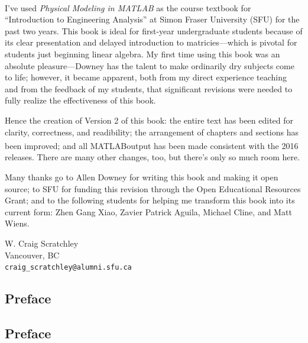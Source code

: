 \documentclass[
]{book}
\newcommand{\myreg}{\textsuperscript{{\tiny \textregistered}}}
\newcommand{\thetitle}{Physical Modeling in MATLAB\myreg}
\begin{document}
I've used \textit{\thetitle} as the course
textbook for ``Introduction to Engineering Analysis'' at Simon Fraser
University (SFU) for the past two years. This book is ideal for
first-year undergraduate students because of its clear presentation and
delayed introduction to matricies---which is pivotal for students
just beginning linear algebra.  My first time using this book was an
absolute pleasure---Downey has the talent to make ordinarily dry
subjects come to life; however, it became apparent, both from my direct
experience teaching and from the feedback of my students, that
significant revisions were needed to fully realize the effectiveness
of this book.

Hence the creation of Version 2 of this book: the entire text
has been edited for clarity, correctness, and readibility; the
arrangement of chapters and sections has been improved;
and all MATLAB\myreg output has been made consistent
with the 2016 releases. There are many other
changes, too, but there's only so much room here.

Many thanks go to Allen Downey for writing this book and making it open
source; to SFU for funding this revision through the Open Educational
Resources Grant; and to the following students for helping me transform
this book into its current form: Zhen Gang Xiao, Zavier Patrick Aguila,
Michael Cline, and Matt Wiens.

\noindent W. Craig Scratchley
\\
\noindent Vancouver, BC
\\
{\tt craig\_scratchley@alumni.sfu.ca}

\newpage

\begin{latexonly}
\chapter{Preface}
\end{latexonly}
\begin{htmlonly}
\chapter*{Preface} %
\end{htmlonly}
\end{document}
